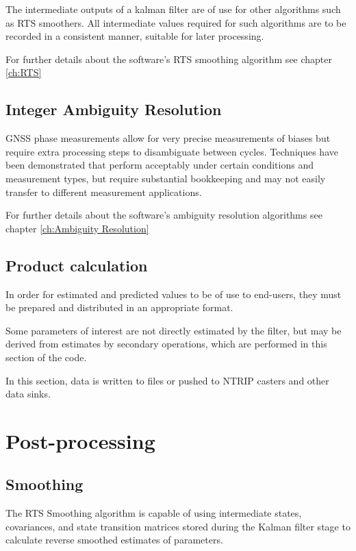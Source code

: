 The intermediate outputs of a kalman filter are of use for other algorithms such as RTS smoothers. All intermediate values required for such algorithms are to be recorded in a consistent manner, suitable for later processing.

For further details about the software's RTS smoothing algorithm see chapter \ref{ch:RTS}


\subsection{Integer Ambiguity Resolution}

GNSS phase measurements allow for very precise measurements of biases but require extra processing steps to disambiguate between cycles. Techniques have been demonstrated that perform acceptably under certain conditions and measurement types, but require substantial bookkeeping and may not easily transfer to different measurement applications.

For further details about the software's ambiguity resolution algorithms see chapter \ref{ch:Ambiguity Resolution}


\subsection{Product calculation}

In order for estimated and predicted values to be of use to end-users, they must be prepared and distributed in an appropriate format.

Some parameters of interest are not directly estimated by the filter, but may be derived from estimates by secondary operations, which are performed in this section of the code.

In this section, data is written to files or pushed to NTRIP casters and other data sinks.


\section{Post-processing}


\subsection{Smoothing}

The RTS Smoothing algorithm is capable of using intermediate states, covariances, and state transition matrices stored during the Kalman filter stage to calculate reverse smoothed estimates of parameters.

